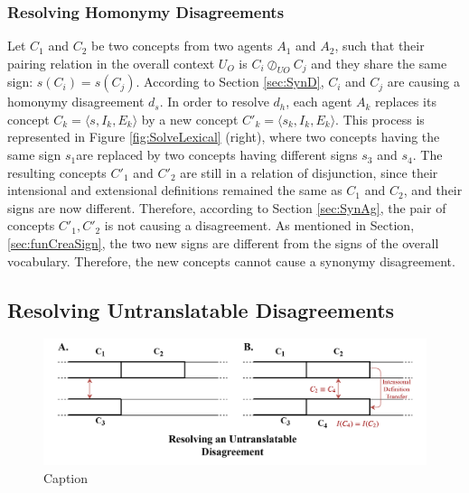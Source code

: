\subsubsection{Resolving Homonymy Disagreements}

Let $C_{1}$ and $C_{2}$ be two concepts from two agents $A_{1}$ and $A_{2}$, such that their pairing relation in the overall context $U_{O}$ is $C_{i} \oslash_{UO} C_{j}$ and they share the same sign: $s(C_{i}) = s(C_{j})$. According to Section \ref{sec:SynD}, $C_{i}$ and $C_{j}$ are causing a homonymy disagreement $d_{s}$.
In order to resolve $d_{h}$, each agent $A_{k}$ replaces its concept $C_{k} = \langle s, I_{k}, E_{k} \rangle$ by a new concept $C'_{k} = \langle s_{k}, I_{k}, E_{k} \rangle$. This process is represented in Figure \ref{fig:SolveLexical} (right), where two concepts having the same sign $s_{1}$are replaced by two concepts having different signs $s_{3}$ and $s_{4}$.
The resulting concepts $C'_{1}$ and $C'_{2}$ are still in a relation of disjunction, since their intensional and extensional definitions remained the same as $C_{1}$ and $C_{2}$, and their signs are now different. Therefore, according to Section \ref{sec:SynAg}, the pair of concepts $C'_{1}, C'_{2}$ is not causing a disagreement.
As mentioned in Section, \ref{sec:funCreaSign}, the two new signs are different from the signs of the overall vocabulary. Therefore, the new concepts cannot cause a synonymy disagreement.

\subsection{Resolving Untranslatable Disagreements}

\begin{figure}[t]
    \centering
    \includegraphics[width=\textwidth]{figs/Untranslatable.pdf}
    \caption{Caption}
    \label{fig:SolveUntrans}
\end{figure}

